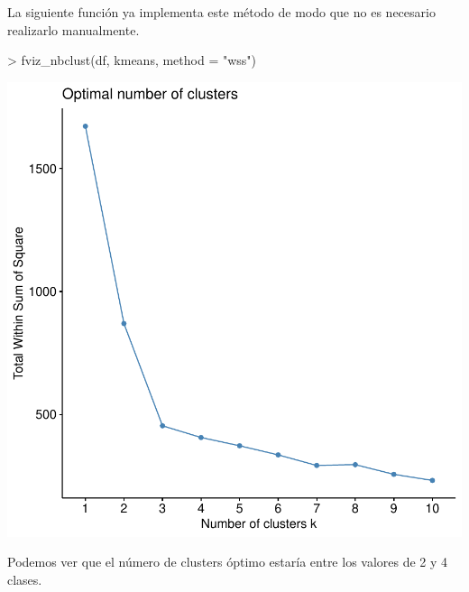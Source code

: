 \documentclass [a4paper] {article}
\begin{document}
La siguiente función ya implementa este método de modo que no es necesario realizarlo manualmente.
\begin{center}
\begin{Schunk}
\begin{Sinput}
> fviz_nbclust(df, kmeans, method = "wss")
\end{Sinput}
\end{Schunk}
\includegraphics{entrega-optimal_number_of_clusters_2}
\end{center}

Podemos ver que el número de clusters óptimo estaría entre los valores de 2 y 4 clases.
\end{document}
